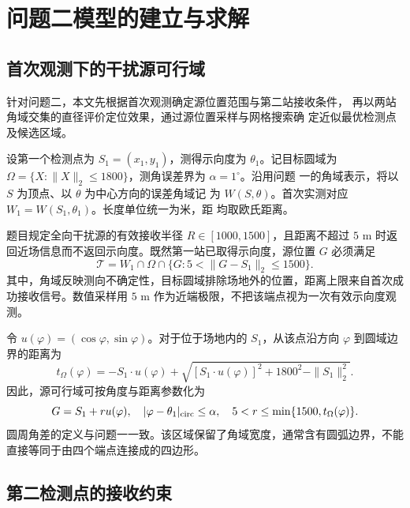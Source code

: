 \providecommand{\pTwoPageBreak}{}
\providecommand{\pTwoFigDir}{figures}
\section{问题二模型的建立与求解}
\label{sec:p2-model}

\subsection{首次观测下的干扰源可行域}

针对问题二，本文先根据首次观测确定源位置范围与第二站接收条件，
再以两站角域交集的直径评价定位效果，通过源位置采样与网格搜索确
定近似最优检测点及候选区域。

设第一个检测点为 $S_1=(x_1,y_1)$，测得示向度为 $\theta_1$。记目标圆域为
 $\Omega=\{X:\|X\|_2\le1800\}$，测角误差界为 $\alpha=1^\circ$。沿用问题
 一的角域表示，将以 $S$ 为顶点、以 $\theta$ 为中心方向的误差角域记
 为 $W(S,\theta)$。首次实测对应 $W_1=W(S_1,\theta_1)$。长度单位统一为米，距
 均取欧氏距离。

题目规定全向干扰源的有效接收半径 $R\in[1000,1500]$，且距离不超过 $5$ m 时返回近场信息而不返回示向度。既然第一站已取得示向度，源位置 $G$ 必须满足
\begin{equation}\label{eq:p2-source}
\mathcal T=W_1\cap\Omega\cap\{G:5<\|G-S_1\|_2\le1500\}.
\end{equation}
其中，角域反映测向不确定性，目标圆域排除场地外的位置，距离上限来自首次成功接收信号。数值采样用 $5$ m 作为近端极限，不把该端点视为一次有效示向度观测。

令 $u(\varphi)=(\cos\varphi,\sin\varphi)$。对于位于场地内的 $S_1$，从该点沿方向 $\varphi$ 到圆域边界的距离为
\begin{equation}\label{eq:p2-arena}
t_\Omega(\varphi)=-S_1\cdot u(\varphi)
+\sqrt{[S_1\cdot u(\varphi)]^2+1800^2-\|S_1\|_2^2}.
\end{equation}
因此，源可行域可按角度与距离参数化为
\begin{equation}\label{eq:p2-param}
G=S_1+r u(\varphi),\quad
|\varphi-\theta_1|_{\rm circ}\le\alpha,\quad
5<r\le\min\{1500,t_\Omega(\varphi)\}.
\end{equation}
圆周角差的定义与问题一一致。该区域保留了角域宽度，通常含有圆弧边界，不能直接等同于由四个端点连接成的四边形。

\subsection{第二检测点的接收约束}

